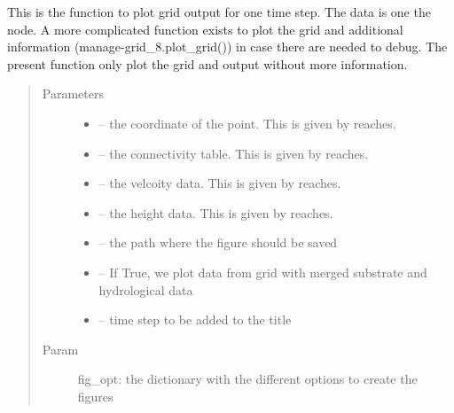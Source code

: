 \documentclass[letterpaper,10pt,english]{sphinxmanual}
\begin{document}

\begin{fulllineitems}
\label{\detokenize{index:src.manage_grid_8.plot_grid_simple}}
This is the function to plot grid output for one time step. The data is one the node. A more complicated function
exists to plot the grid and additional information (manage-grid\_8.plot\_grid()) in case there are needed to debug.
The present function only plot the grid and output without more information.
\begin{quote}\begin{description}
\item[{Parameters}] \leavevmode\begin{itemize}
\item {} 
 -- the coordinate of the point. This is given by reaches.

\item {} 
 -- the connectivity table. This is given by reaches.

\item {} 
 -- the velcoity data. This is given by reaches.

\item {} 
 -- the height data. This is given by reaches.

\item {} 
 -- the path where the figure should be saved

\item {} 
 -- If True, we plot data from grid with merged substrate and hydrological data

\item {} 
 -- time step to be added to the title

\end{itemize}

\item[{Param}] \leavevmode
fig\_opt: the dictionary with the different options to create the figures

\end{description}\end{quote}

\end{fulllineitems}
\end{document}
